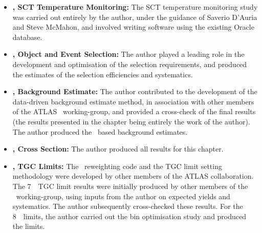 \begin{itemize}

\item {\bf {}, SCT Temperature Monitoring:} The SCT temperature
monitoring study was carried out entirely by the author, under the guidance of
Saverio D'Auria and Steve McMahon, and involved writing software using
the existing Oracle database. 

\item {\bf {}, Object and Event Selection:} The author played a
leading role in the development and optimisation of the selection requirements,
and produced the estimates of the selection efficiencies and systematics.

\item {\bf {}, Background Estimate:} The author contributed to the 
development of the data-driven background estimate method, in association with other members
of the ATLAS \ZZ\ working-group, and provided a cross-check of the final
results (the results presented in the chapter being entirely the work of the
author). The author produced the \mc\ based background estimates.

\item {\bf {}, Cross Section:} The author produced all results for
this chapter.

\item {\bf {}, TGC Limits:} The \AfterBurner\ reweighting code and the TGC
limit setting methodology were developed by other members of the ATLAS
collaboration.
The 7~\tev\ TGC limit results were initially produced by
other members of the \ZZ\ working-group, using inputs from the author on expected
yields and systematics. The author subsequently cross-checked these results. For
the 8~\tev\ limits, the author carried out the bin optimisation study and
produced the limits.

\end{itemize}
